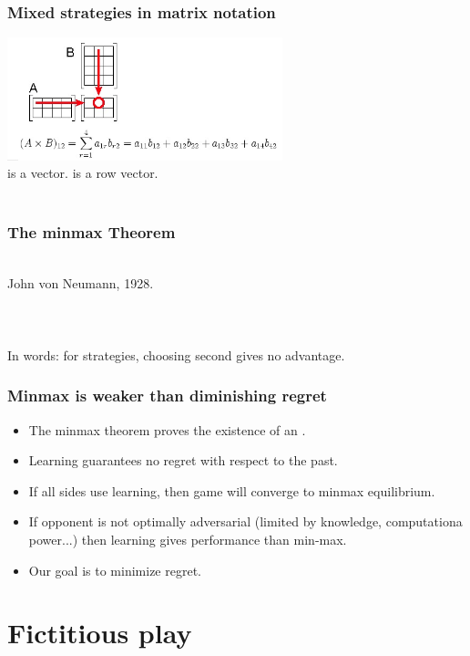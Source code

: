 \documentclass[handout]{beamer}
\begin{document}
\begin{frame}
\frametitle{Mixed strategies in matrix notation}
\includegraphics[width=8cm]{figures/matrixProduct.jpg}
\pause \\
\R{$\Q$} is a  vector.  is a row vector.
\pause \\ ~\\
\end{frame}

\begin{frame}
\frametitle{The minmax Theorem}
~\\
John von Neumann, 1928.
\\ ~ \\ \pause
\R{\[ \minp \maxq \mpq \leq \maxq \minp \mpq \]}
\\ ~ \\ \pause
In words: for  strategies, choosing second gives no advantage.
\end{frame}

\begin{frame}
\frametitle{Minmax is weaker than diminishing regret}
\begin{itemize}
\item The minmax theorem proves the existence of an .
\item Learning guarantees no regret with respect to the past.
\item If all sides use learning, then game will converge to minmax equilibrium.
\item If opponent is not optimally adversarial (limited by knowledge, computationa power...) then learning gives  performance than min-max.
\item Our goal is to minimize regret.
\end{itemize}
\end{frame}

\section{Fictitious play}
\end{document}
